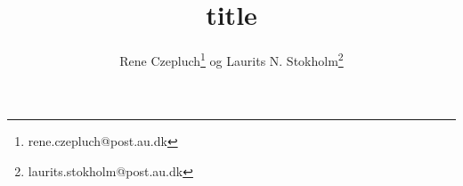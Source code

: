 \documentclass[danish,a4paper,twocolumn, oneside]{memoir}
\title{title}
\author{Rene Czepluch\thanks{rene.czepluch@post.au.dk} og Laurits N. Stokholm\thanks{laurits.stokholm@post.au.dk}}
\date
\begin{document}
\maketitle
\noindent







\end{document}
